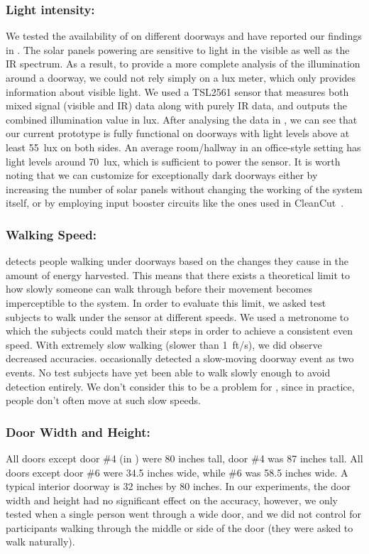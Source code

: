 \subsubsection{Light intensity:}
We tested the availability of \sysname on different doorways and have reported our findings in .
The solar panels powering \sysname are sensitive to light in the visible as well as the IR spectrum.
As a result, to provide a more complete analysis of the illumination around a doorway, we could not rely simply on a lux meter, which only provides information about visible light.
We used a TSL2561 sensor that measures both mixed signal (visible and IR) data along with purely IR data, and outputs the combined illumination value in lux.
After analysing the data in , we can see that our current prototype is fully functional on doorways with light levels above at least 55~lux on both sides.
An average room/hallway in an office-style setting has light levels around 70~lux, which is sufficient to power the \sysname sensor.
It is worth noting that we can customize \sysname for exceptionally dark doorways either by increasing the number of solar panels without changing the working of the system itself, or by employing input booster circuits like the ones used in CleanCut~\cite{colin2018cleancut}.

\subsubsection{Walking Speed:}
\sysname detects people walking under doorways based on the changes they cause in the amount of energy harvested.
This means that there exists a theoretical limit to how slowly someone can walk through before their movement becomes imperceptible to the system.
In order to evaluate this limit, we asked test subjects to walk under the sensor at different speeds.
We used a metronome to which the subjects could match their steps in order to achieve a consistent even speed.
With extremely slow walking (slower than 1~ft/s), we did observe decreased accuracies.
\sysname occasionally detected a slow-moving doorway event as two events.
No test subjects have yet been able to walk slowly enough to avoid detection entirely.
We don't consider this to be a problem for \sysname, since in practice, people don't often move at such slow speeds.

\subsubsection{Door Width and Height:}
All doors except door \#4 (in ) were 80 inches tall, door \#4 was 87 inches tall. 
All doors except door \#6 were 34.5 inches wide, while \#6 was 58.5 inches wide.
A typical interior doorway is 32 inches by 80 inches.
In our experiments, the door width and height had no significant effect on the accuracy, however, we only tested when a single person went through a wide door, and we did not control for participants walking through the middle or side of the door (they were asked to walk naturally).


